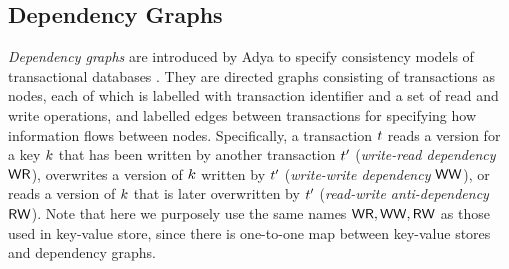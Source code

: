\subsection{Dependency Graphs}

\emph{Dependency graphs} are introduced by Adya to specify consistency models of transactional databases \cite{adya}. 
They are directed graphs consisting of transactions as nodes, 
each of which is labelled with transaction identifier and a set of read and write operations,
and labelled edges between transactions for specifying how information flows between nodes. 
Specifically, a transaction $t$ reads a version for a key $k$ that has been written by another transaction $t'$ 
(\emph{write-read dependency} \( \mathsf{WR}\)), overwrites a version of $k$ written by $t'$ (\emph{write-write dependency} \( \mathsf{WW} \)),
or reads a version of $k$ that is later overwritten by $t'$ (\emph{read-write anti-dependency} \( \mathsf{RW} \)).
Note that here we purposely use the same names \( \mathsf{WR}, \mathsf{WW}, \mathsf{RW} \) as those used in key-value store,
since there is one-to-one map between key-value stores and dependency graphs.



